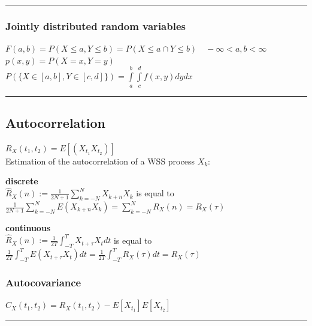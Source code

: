 \vspace{2mm}
\hrule
\vspace{3mm}

\subsubsection{Jointly distributed random variables }
$F(a,b)=P(X \leq a, Y \leq b) = P(X \leq a \cap Y \leq b) \quad -\infty < a,b < \infty $\\
$p(x,y)=P(X=x, Y=y)$\\
$P(\{X \in [a,b], Y \in [c,d]\})= \int\limits_a^b \int\limits_c^d f(x,y)dy dx $

\vspace{2mm}
\hrule

\subsection{Autocorrelation}
	$\boxed{R_X(t_1,t_2)=E\left[(X_{t_1} X_{t_2})\right]}$\\
	\vspace{0.2cm}
	Estimation of the autocorrelation of a WSS process $X_k$:\\
\begin{minipage}{9cm}
	\textbf{discrete}	\\
	$\boxed{\hat{R}_X(n):=\frac{1}{2N+1} \displaystyle\sum_{k=-N}^{N}X_{k+n}X_k} $ is equal to\\
	$\boxed{\frac{1}{2N+1} \displaystyle\sum_{k=-N}^{N} E(X_{k+n}X_k) = \displaystyle\sum_{k=-N}^{N} R_X(n) = R_X(\tau)} $
\end{minipage}
\hspace{0.5cm}
\begin{minipage}{9cm}
	\textbf{continuous}	\\
	$\boxed{ \hat{R}_X(n):= \frac{1}{2T} \displaystyle\int_{-T}^T X_{t+\tau}X_t dt }$ is equal to\\
	$\boxed{ \frac{1}{2T} \displaystyle\int_{-T}^T E(X_{t+\tau}X_t)dt = \frac{1}{2T} \displaystyle\int_{-T}^T R_X(\tau) dt = R_X(\tau) }$
\end{minipage}

\subsubsection{Autocovariance}
$\boxed{C_X(t_1,t_2)=R_X(t_1,t_2)-E\left[X_{t_1} \right]E\left[X_{t_2}\right]}$

\vspace{2mm}
\hrule
\vspace{3mm}

